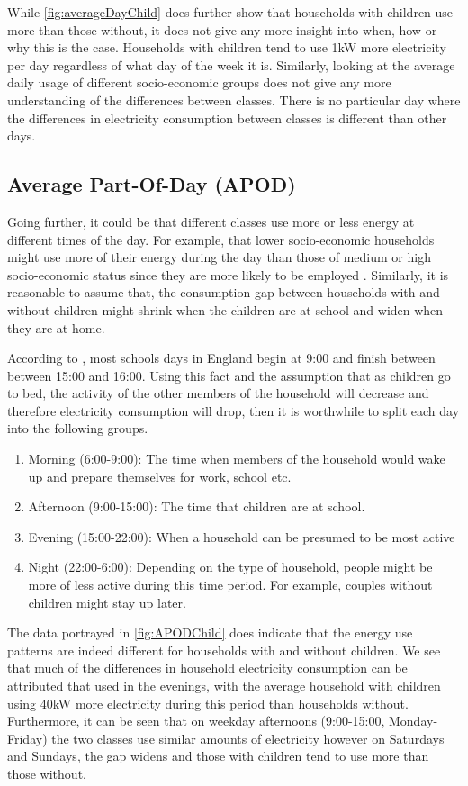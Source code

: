 \averageDayChild
\averageDaySocio

While \ref{fig:averageDayChild} does further show that households with children use more than those without, it does not give any more insight into when, how or why this is the case. Households with children tend to use 1kW more electricity per day regardless of what day of the week it is.
Similarly, looking at the average daily usage of different socio-economic groups does not give any more understanding of the differences between classes. There is no particular day where the differences in electricity consumption between classes is different than other days.

\subsection*{Average Part-Of-Day (APOD)}
Going further, it could be that different classes use more or less energy at different times of the day. For example, that lower socio-economic households might use more of their energy during the day than those of medium or high socio-economic status since they are more likely to be employed \cite{Bartley}. Similarly, it is reasonable to assume that, the consumption gap between households with and without children might shrink when the children are at school and widen when they are at home.

According to \cite{school times}, most schools days in England begin at 9:00 and finish between between 15:00 and 16:00. Using this fact and the assumption that as children go to bed, the activity of the other members of the household will decrease and therefore electricity consumption will drop, then it is worthwhile to split each day into the following groups.
\begin{enumerate}
\item Morning (6:00-9:00): The time when members of the household would wake up and prepare themselves for work, school etc.
\item Afternoon (9:00-15:00): The time that children are at school.
\item Evening (15:00-22:00):  When a household can be presumed to be most active
\item Night (22:00-6:00): Depending on the type of household, people might be more of less active during this time period. For example, couples without children might stay up later.
\end{enumerate}
\APODChild


The data portrayed in \ref{fig:APODChild} does indicate that the energy use patterns are indeed different for households with and without children. We see that much of the differences in household electricity consumption can be attributed that used in the evenings, with the average household with children using 40kW more electricity during this period than households without. Furthermore, it can be seen that on weekday afternoons (9:00-15:00, Monday-Friday) the two classes use similar amounts of electricity however on Saturdays and Sundays, the gap widens and those with children tend to use more than those without. 

